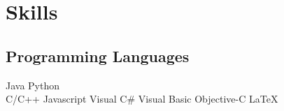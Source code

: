 \documentclass[]{deedy-resume-openfont}
\begin{document}
\begin{minipage}[t]{0.33\textwidth}




\section{Skills}
\subsection{Programming Languages}
Java \textbullet{} Python\\  %
\vspace{1mm}
C/C++  \textbullet{} Javascript \textbullet{} Visual C\# \textbullet{}Visual Basic \textbullet{} Objective-C \textbullet{} \LaTeX
\sectionsep


\end{minipage}
\end{document}
